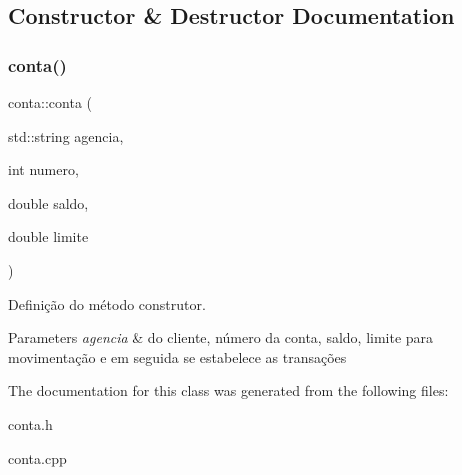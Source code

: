 \subsection{Constructor \& Destructor Documentation}
\mbox{\label{classconta_ae1ae229747e7746c07ba63a442f4e32a}} 
\subsubsection{\texorpdfstring{conta()}{conta()}}
{\footnotesize\ttfamily conta\+::conta (\begin{DoxyParamCaption}\item[{std\+::string}]{agencia,  }\item[{int}]{numero,  }\item[{double}]{saldo,  }\item[{double}]{limite }\end{DoxyParamCaption})}



Definição do método construtor. 


\begin{DoxyParams}{Parameters}
{\em agencia} & do cliente, número da conta, saldo, limite para movimentação e em seguida se estabelece as transações \\
\hline
\end{DoxyParams}


The documentation for this class was generated from the following files\+:\begin{DoxyCompactItemize}
\item 
conta.\+h\item 
conta.\+cpp\end{DoxyCompactItemize}
